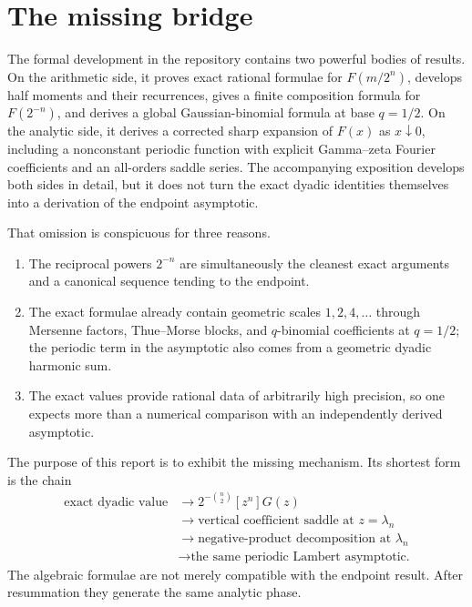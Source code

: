 \documentclass[11pt,oneside]{article}
\theoremstyle{definition}
\theoremstyle{remark}
\begin{document}
\begingroup
\footnotesize
\tableofcontents
\endgroup
\newpage

\section{The missing bridge}
\label{sec:introduction}

The formal development in the repository \cite{proveit} contains two powerful bodies of results.
On the arithmetic side, it proves exact rational formulae for $F(m/2^n)$, develops half moments and their recurrences, gives a finite composition formula for $F(2^{-n})$, and derives a global Gaussian-binomial formula at base $q=1/2$.  On the analytic side, it derives a corrected sharp expansion of $F(x)$ as $x\downarrow0$, including a nonconstant periodic function with explicit Gamma--zeta Fourier coefficients and an all-orders saddle series.  The accompanying exposition \cite{masterdoc} develops both sides in detail, but it does not turn the exact dyadic identities themselves into a derivation of the endpoint asymptotic.

That omission is conspicuous for three reasons.

\begin{enumerate}
\item The reciprocal powers $2^{-n}$ are simultaneously the cleanest exact arguments and a canonical sequence tending to the endpoint.
\item The exact formulae already contain geometric scales $1,2,4,\ldots$ through Mersenne factors, Thue--Morse blocks, and $q$-binomial coefficients at $q=1/2$; the periodic term in the asymptotic also comes from a geometric dyadic harmonic sum.
\item The exact values provide rational data of arbitrarily high precision, so one expects more than a numerical comparison with an independently derived asymptotic.
\end{enumerate}

The purpose of this report is to exhibit the missing mechanism.  Its shortest form is the chain
\begin{equation}
\boxed{
\begin{aligned}
\text{exact dyadic value}
&\longrightarrow 2^{-\binom n2}[z^n]G(z)\\
&\longrightarrow \text{vertical coefficient saddle at }z=\lambda_n\\
&\longrightarrow \text{negative-product decomposition at }\lambda_n\\
&\longrightarrow \text{the same periodic Lambert asymptotic.}
\end{aligned}}
\label{eq:bridge-chain}
\end{equation}
The algebraic formulae are not merely compatible with the endpoint result.  After resummation they generate the same analytic phase.
\end{document}
